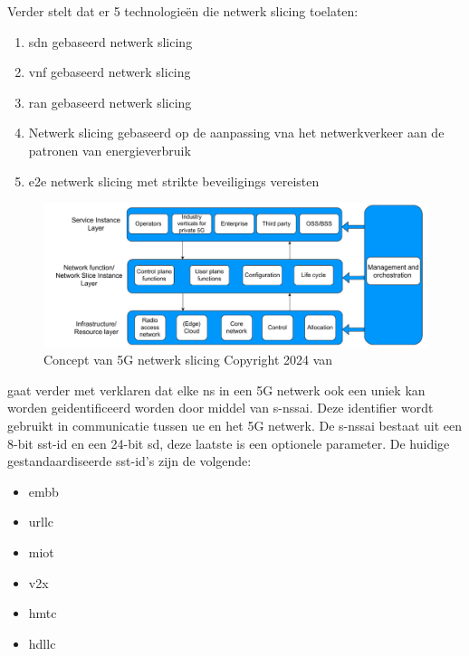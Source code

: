 Verder stelt \textcite{Lorincz2024} dat er 5 technologieën die netwerk slicing toelaten:

\begin{enumerate}
  \item \gls{sdn} gebaseerd netwerk slicing
  \item \gls{vnf} gebaseerd netwerk slicing
  \item \gls{ran} gebaseerd netwerk slicing
  \item Netwerk slicing gebaseerd op de aanpassing vna het netwerkverkeer aan de patronen van energieverbruik
  \item \gls{e2e} netwerk slicing met strikte beveiligings vereisten
\end{enumerate}

\begin{figure}[H]
  \includegraphics[width=\linewidth]{../graphics/slice.png}
  \caption{Concept van 5G netwerk slicing \autocite[Door][]{Lorincz2024} Copyright 2024 van \textcite{Lorincz2024}}
  \label{fig:slice}
\end{figure}

\textcite{Lorincz2024} gaat verder met verklaren dat elke \gls{ns} in een 5G netwerk ook een uniek kan worden geidentificeerd worden door middel van \gls{s-nssai}. Deze identifier wordt gebruikt in communicatie tussen \gls{ue} en het 5G netwerk. De \gls{s-nssai} bestaat uit een 8-bit \gls{sst-id} en een 24-bit \gls{sd}, deze laatste is een optionele parameter. De huidige gestandaardiseerde \gls{sst-id}'s zijn de volgende:

\begin{itemize}
  \item \gls{embb}
  \item \gls{urllc}
  \item \gls{miot}
  \item \gls{v2x}
  \item \gls{hmtc}
  \item \gls{hdllc}
\end{itemize}

